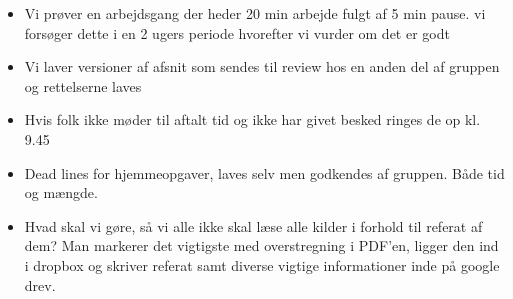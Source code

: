 \begin{itemize}
\begin{itemize}
     
   	 \item Vi prøver en arbejdsgang der heder 20 min arbejde fulgt af 5 min pause. vi forsøger dette i en 2 ugers periode hvorefter vi vurder om det er godt
   	 \item Vi laver versioner af afsnit som sendes til review hos en anden del af gruppen og rettelserne laves
   	 \item Hvis folk ikke møder til aftalt tid og ikke har givet besked ringes de op kl. 9.45
   	 \item Dead lines for hjemmeopgaver, laves selv men godkendes af gruppen. Både tid og mængde. 
   	 \item Hvad skal vi gøre, så vi alle ikke skal læse alle kilder i forhold til referat af dem? Man markerer det vigtigste med overstregning i PDF’en, ligger den ind i dropbox og skriver referat samt diverse vigtige informationer inde på google drev.
   	 
   \end{itemize}
   
  \end{itemize}
  
  \clearpage